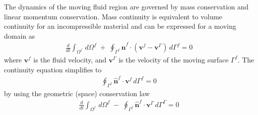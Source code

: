 \documentclass[sn-mathphys,Numbered]{sn-jnl}%
\newcommand{\bb}{\boldsymbol}
\begin{document}
The dynamics of the moving fluid region are governed by mass conservation and linear momentum conservation.
%
Mass continuity is equivalent to volume continuity for an incompressible material and can be expressed for a moving domain as
\begin{eqnarray} \label{eqn:continuity_deformed_full}
	\frac{d}{dt} \int_{\Omega^f} \, d\Omega^f
	\;+\; \oint_{ \Gamma^f} \hat{\bb{n}}^f \cdot (\bb{v}^f - \boldsymbol{v}^{\Gamma}) \, d\Gamma^f = 0
\end{eqnarray}
where $\bb{v}^f$ is the fluid velocity, and $\boldsymbol{v}^\Gamma$ is the velocity of the moving surface $\Gamma^f$.
The continuity equation simplifies to
\begin{eqnarray} \label{eqn:continuity_deformed}
	\oint_{ \Gamma^f} \hat{\bb{n}}^f \cdot \bb{v}^f \, d\Gamma^f = 0
\end{eqnarray}
by using the geometric (space) conservation law
\begin{eqnarray} \label{eqn:space_conservation}
	\frac{d}{dt} \int_{\Omega^f} \, d\Omega^f
	\; - \; \oint_{ \Gamma^f} \hat{\bb{n}}^f \cdot \boldsymbol{v}^\Gamma \, d\Gamma^\Gamma = 0
\end{eqnarray}
\end{document}
